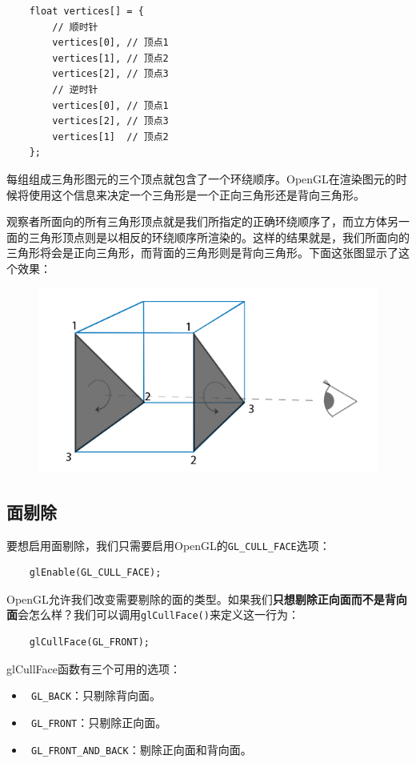 \documentclass[UTF8,a4paper,12pt]{ctexbook}
\begin{document}
			
			\begin{lstlisting}
	float vertices[] = {
	    // 顺时针
	    vertices[0], // 顶点1
	    vertices[1], // 顶点2
	    vertices[2], // 顶点3
	    // 逆时针
	    vertices[0], // 顶点1
	    vertices[2], // 顶点3
	    vertices[1]  // 顶点2  
	};			
			\end{lstlisting}
			
			每组组成三角形图元的三个顶点就包含了一个环绕顺序。OpenGL在渲染图元的时候将使用这个信息来决定一个三角形是一个正向三角形还是背向三角形。
			
			观察者所面向的所有三角形顶点就是我们所指定的正确环绕顺序了，而立方体另一面的三角形顶点则是以相反的环绕顺序所渲染的。这样的结果就是，我们所面向的三角形将会是正向三角形，而背面的三角形则是背向三角形。下面这张图显示了这个效果：
			\begin{figure}[H]
				\centering
				\includegraphics[width=.9\linewidth]{faceculling_frontback}
			\end{figure}
			
			
		\subsection{面剔除}
			要想启用面剔除，我们只需要启用OpenGL的\verb|GL_CULL_FACE|选项：
			\begin{lstlisting}
	glEnable(GL_CULL_FACE);			
			\end{lstlisting}
			
			OpenGL允许我们改变需要剔除的面的类型。如果我们\textbf{只想剔除正向面而不是背向面}会怎么样？我们可以调用\verb|glCullFace()|来定义这一行为：
			\begin{lstlisting}
	glCullFace(GL_FRONT);
			\end{lstlisting}
			
			glCullFace函数有三个可用的选项：
			\begin{itemize}
				\item\verb| GL_BACK|：只剔除背向面。
				\item\verb| GL_FRONT|：只剔除正向面。
				\item\verb| GL_FRONT_AND_BACK|：剔除正向面和背向面。
			\end{itemize}
			
\end{document}
